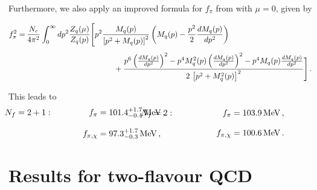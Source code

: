 \documentclass[aps,twocolumn,prd,superscriptaddress]{revtex4-2}
\begin{document}
%
Furthermore, we also apply an improved formula for $f_\pi$ from \cite{Barducci:1997jh} with $\mu= 0$, given by
%
\begin{widetext}
	\begin{align}\label{eq:fpi_PS_improved}
		f_\pi^2 =&\,  \frac{N_c}{4\pi^2} \int_0^\infty  dp^2 \frac{Z_q(\mu)}{Z_q(p)}\Bigg[
		p^2 \frac{M_q(p)}{\left[p^2 + M_q(p)\right]^2}	\left(M_q(p) - \frac{p^2}{2}\frac{dM_q(p)}{dp^2}\right)
		\notag\\[1ex]
		&\hspace{4cm} + \frac{p^6 \left(\frac{dM_q(p)}{dp^2}\right)^2 - p^4 M_q^2(p) \left(\frac{dM_q(p)}{dp^2}\right)^2 - p^4 M_q(p) \frac{dM_q(p)}{dp^2}}{2 \,\left[p^2 + M_q^2(p) \right]^2}
		\Bigg]\,.
	\end{align}
\end{widetext}
%
This leads to 
%
\begin{subequations}\label{eq:fpi_PS_improved_results}
	\begin{align}
		\hspace{-1cm}N_f=2+1:\hspace{1.5cm} 	
		f_\pi &= 101.4^{+1.7}_{-0.4}\,\unit{\MeV}\,,
		\notag \\[2ex]
		f_{\pi,\chi} &= 97.3^{+1.7}_{-0.3}\,\unit{\MeV}\,,
	\end{align}
	\begin{align}
		\hspace{-1cm}N_f=2:\hspace{2cm} 	
		f_\pi &= \qty{103.9}{\MeV}\,,
		\notag \\[2ex]
		f_{\pi,\chi} &= \qty{100.6}{\MeV}\,.\quad
	\end{align}
\end{subequations}
%


\section{Results for two-flavour QCD}
\label{app:TwoFlavourQCD}
\end{document}
